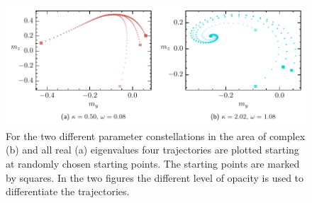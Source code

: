 \begin{figure}[H]
    \centering
    \includegraphics{pictures/example_traj_d0.pdf}
    \caption{For the two different parameter constellations in the area of complex (b) and all real (a) eigenvalues four trajectories are plotted starting at randomly chosen starting points. The starting points are marked by squares. In the two figures the different level of opacity is used to differentiate the trajectories.
    }
    \label{fig:expl_traj_d0}
\end{figure}

